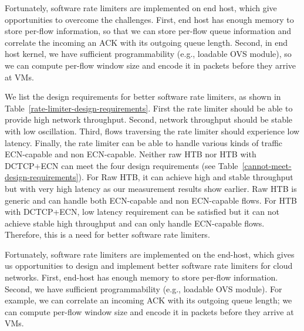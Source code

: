 Fortunately, software rate limiters are implemented on end host, which give opportunities to overcome the challenges. First, end host has enough memory to store per-flow information, so that we can store per-flow queue information and correlate the incoming an ACK with its outgoing queue length. Second, in end host kernel, we have sufficient programmability (e.g., loadable OVS module), so we can compute per-flow window size and encode it in packets before they arrive at VMs.
\fi

We list the design requirements for better software rate limiters, as shown in Table~\ref{rate-limiter-design-requirements}. 
First the rate limiter should be able to provide high network throughput. 
Second, network throughput should be stable with low oscillation. 
Third, flows traversing the rate limiter should experience low latency. 
Finally, the rate limiter can be able to handle various kinds of traffic \textemdash\xspace ECN-capable and non ECN-capable. 
Neither raw HTB nor HTB with DCTCP+ECN can meet the four design requirements (see Table~\ref{cannot-meet-design-requirements}). 
For Raw HTB, it can achieve high and stable throughput but with very high latency as our measurement results show earlier. 
Raw HTB is generic and can handle both ECN-capable and non ECN-capable flows. 
For HTB with DCTCP+ECN, low latency requirement can be satisfied but it can not achieve stable 
high throughput and can only handle ECN-capable flows. Therefore, this is a need for better software rate limiters.

Fortunately, software rate limiters are implemented on the end-host, 
which gives us opportunities to design and implement better software rate limiters for cloud networks. 
First, end-host has enough memory to store per-flow information. 
Second, we have sufficient programmability (e.g., loadable OVS module). For example, we can 
correlate an incoming ACK with its outgoing queue length; we can compute per-flow window size and 
encode it in packets before they arrive at VMs.
